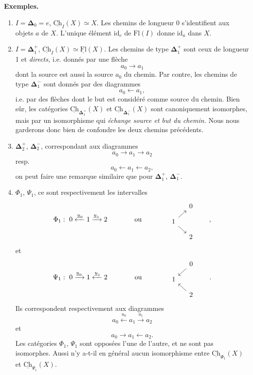 \documentclass[11pt]{article}
\newcommand{\printedpage}[1]{\if\relax\detokenize{#1}\relax\else\marginpar{\raggedright\footnotesize p.~#1}\fi}
\newcommand{\msp}[1]{\marginpar{\raggedright\footnotesize [#1]}}
\newcommand{\bDelta}{\boldsymbol{\Delta}}
\newcommand{\Ch}{\underline{\mathrm{Ch}}}
\newcommand{\uFl}{\underline{\mathrm{Fl}}}
\begin{document}
\msp{page 15}

\textbf{Exemples.}

\begin{enumerate}
\item[1.] $I = \bDelta_0 = e$, $\Ch_I(X) \simeq X$. Les chemins de longueur 0 s'identifient aux objets $a$ de $X$. L'unique élément $\mathrm{id}_e$ de $\mathrm{Fl}(I)$ donne $\mathrm{id}_a$ dans $X$.

\item[2.] $I = \bDelta_1^+$, $\Ch_I(X) \simeq \uFl(X)$. Les chemins de type $\bDelta_1^+$ sont ceux de longueur 1 et \textit{directs,} i.e. donnés par une flèche
\[
a_0 \longrightarrow a_1
\]
dont la source est aussi la source $a_0$ du chemin. Par contre, les chemins de type $\bDelta_1^-$ sont donnés par des diagrammes
\[
a_0 \longleftarrow a_1,
\]
i.e. par des flèches dont le but est considéré comme source du chemin. Bien sûr, les catégories $\Ch_{\bDelta_1^+}(X)$ et $\Ch_{\bDelta_1^-}(X)$ sont canoniquement isomorphes, mais par un isomorphisme qui \textit{échange source et but du chemin.} Nous nous garderons donc bien de confondre les deux chemins précédents.

\msp{page 16}

\item[3.] $\bDelta_2^+$, $\bDelta_2^-$, correspondant aux diagrammes
\[
a_0 \longrightarrow a_1 \longrightarrow a_2
\]
resp.
\[
a_0 \longleftarrow a_1 \longleftarrow a_2,
\]
on peut faire une remarque similaire que pour $\bDelta_1^+$, $\bDelta_1^-$.

\printedpage{11}

\item[4.] $\Phi_1$, $\Psi_1$, ce sont respectivement les intervalles
\[
\Phi_1 :\ 0 \xleftarrow{\underline{u}_0} 1 \xrightarrow{\underline{u}_1} 2 \qquad\qquad \text{ou} \qquad\qquad
\begin{tikzcd}[row sep=small, column sep=small]
 & 0 \\
1 \arrow[ur] \arrow[dr] & \\
 & 2
\end{tikzcd}
\qquad , %
\]
et
\[
\Psi_1 :\ 0 \xrightarrow{\underline{u}_0} 1 \xleftarrow{\underline{u}_1} 2 \qquad\qquad \text{ou} \qquad\qquad
\begin{tikzcd}[row sep=small, column sep=small]
 & 0 \arrow[dl] \\
1 & \\
 & 2 \arrow[ul]
\end{tikzcd}
\qquad .
\]
Ils correspondent respectivement aux diagrammes
\[
a_0 \xleftarrow{u_0} a_1 \xrightarrow{u_1} a_2
\]
et
\[
a_0 \longrightarrow a_1 \longleftarrow a_2.
\]
Les catégories $\Phi_1$, $\Psi_1$ sont opposées l'une de l'autre, et ne sont pas isomorphes. Aussi n'y a-t-il en général aucun isomorphisme entre $\Ch_{\Phi_1}(X)$ et $\Ch_{\Psi_1}(X)$.
\end{enumerate}
\end{document}

